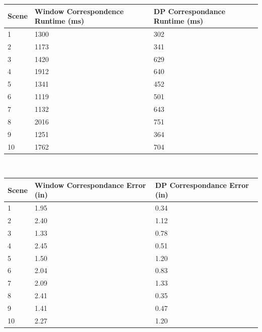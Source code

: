 \documentclass[11pt]{scrartcl}
\begin{document}
\begin{table}[H]
	\begin{tabular}{lll}
		\hline
		Scene & Window Correspondence Runtime (ms) & DP Correspondance Runtime (ms) \\ \hline
		1     & 1300                               & 302                            \\
		2     & 1173                               & 341                            \\
		3     & 1420                               & 629                            \\
		4     & 1912                               & 640                            \\
		5     & 1341                               & 452                            \\
		6     & 1119                               & 501                            \\
		7     & 1132                               & 643                            \\
		8     & 2016                               & 751                            \\
		9     & 1251                               & 364                            \\
		10    & 1762                               & 704                            \\ \hline
	\end{tabular}
\end{table}

\\
\begin{table}[H]
	\begin{tabular}{lll}
		\hline
		Scene & Window Correspondance Error (in) & DP Correspondance Error (in) \\ \hline
		1     & 1.95                             & 0.34                         \\
		2     & 2.40                             & 1.12                         \\
		3     & 1.33                             & 0.78                         \\
		4     & 2.45                             & 0.51                         \\
		5     & 1.50                             & 1.20                         \\
		6     & 2.04                             & 0.83                         \\
		7     & 2.09                             & 1.33                         \\
		8     & 2.41                             & 0.35                         \\
		9     & 1.41                             & 0.47                         \\
		10    & 2.27                             & 1.20                         \\ \hline
	\end{tabular}
\end{table}
\end{document}
